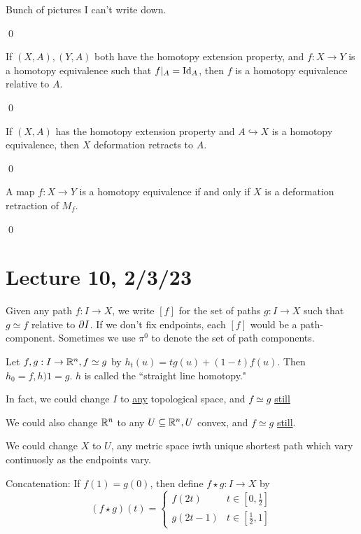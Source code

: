 \documentclass[x11names,reqno,14pt]{extarticle}
\begin{document}
\proof

Bunch of pictures I can't write down. 

\qed

\prop

If $(X, A), (Y, A)$ both have the homotopy extension property, and $f:X\to Y$ is a homotopy equivalence such that $f|_A = \operatorname{\mathrm{Id}}_A$, then $f$ is a homotopy equivalence relative to $A$. 

\proof

\qed

\cor

If $(X, A)$ has the homotopy extension property and $A \hookrightarrow X$ is a homotopy equivalence, then $X$ deformation retracts to $A$. 

\proof

\qed

\cor

A map $f:X\to Y$ is a homotopy equivalence if and only if $X$ is a deformation retraction of $M_f$. 

\proof

\qed

\section*{Lecture 10, 2/3/23}


Given any path $f:I\to X$, we write $[f]$ for the set of paths $g:I\to X$ such that $g \simeq f$ relative to $\partial I$. If we don't fix endpoints, each $[f]$ would be a path-component. Sometimes we use $\pi^0$ to denote the set of path components. 

Let $f, g:I\to\mathbb{R}^n, f\simeq g$ by $h_t(u) = tg(u) + (1 - t)f(u)$. Then $h_0 = f, h)1 = g$. $h$ is called the ``straight line homotopy."

In fact, we could change $I$ to \underline{any} topological space, and $f \simeq g$ \underline{still} 

We could also change $\mathbb{R}^n$ to any $U\subseteq\mathbb{R}^n, U$ convex, and $f\simeq g$ \underline{still}. 

We could change $X$ to $U$, any metric space iwth unique shortest path which vary continuosly as the endpoints vary. 

Concatenation: If $f(1) = g(0)$, then define $f\star g:I\to X$ by 
\[
(f\star g)(t) = \begin{cases} f(2t) & t\in[0,\frac{1}{2}] \\ g(2t-1) & t \in [\frac{1}{2}, 1] \end{cases} 
\]
\end{document}
